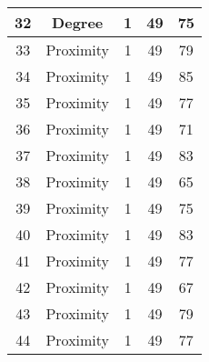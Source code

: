 \documentclass[results.tex]{subfiles}
\begin{document}
\begin{center}
\begin{tabular}{| c || c | c | c | c |}
            \hline
            32                      & Degree                       & 1                      & 49                      & 75                   \\
            \hline
            33                      & Proximity                    & 1                      & 49                      & 79                   \\
            \hline
            34                      & Proximity                    & 1                      & 49                      & 85                   \\
            \hline
            35                      & Proximity                    & 1                      & 49                      & 77                   \\
            \hline
            36                      & Proximity                    & 1                      & 49                      & 71                   \\
            \hline
            37                      & Proximity                    & 1                      & 49                      & 83                   \\
            \hline
            38                      & Proximity                    & 1                      & 49                      & 65                   \\
            \hline
            39                      & Proximity                    & 1                      & 49                      & 75                   \\
            \hline
            40                      & Proximity                    & 1                      & 49                      & 83                   \\
            \hline
            41                      & Proximity                    & 1                      & 49                      & 77                   \\
            \hline
            42                      & Proximity                    & 1                      & 49                      & 67                   \\
            \hline
            43                      & Proximity                    & 1                      & 49                      & 79                   \\
            \hline
            44                      & Proximity                    & 1                      & 49                      & 77                   \\

\end{tabular}
\end{center}
\end{document}
